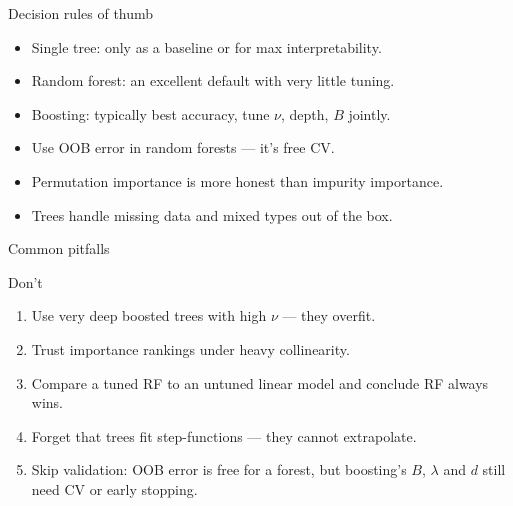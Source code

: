 \documentclass[aspectratio=169,11pt]{beamer}
\begin{document}
\begin{frame}{Decision rules of thumb}\label{frm:rules}
  \begin{itemize}
    \item Single tree: only as a baseline or for max interpretability.
    \item Random forest: an excellent default with very little tuning.
    \item Boosting: typically best accuracy, tune $\nu$, depth, $B$
          jointly.
    \item Use OOB error in random forests --- it's free CV.
    \item Permutation importance is more honest than impurity
          importance.
    \item Trees handle missing data and mixed types out of the box.
  \end{itemize}
\end{frame}

\begin{frame}{Common pitfalls}
  \begin{alertblock}{Don't}
    \begin{enumerate}
      \item Use very deep boosted trees with high $\nu$ --- they
            overfit.
      \item Trust importance rankings under heavy collinearity.
      \item Compare a tuned RF to an untuned linear model and conclude
            RF always wins.
      \item Forget that trees fit step-functions --- they cannot
            extrapolate.
      \item Skip validation: OOB error is free for a forest, but boosting's
            $B$, $\lambda$ and $d$ still need CV or early stopping.
    \end{enumerate}
  \end{alertblock}
\end{frame}
\end{document}
